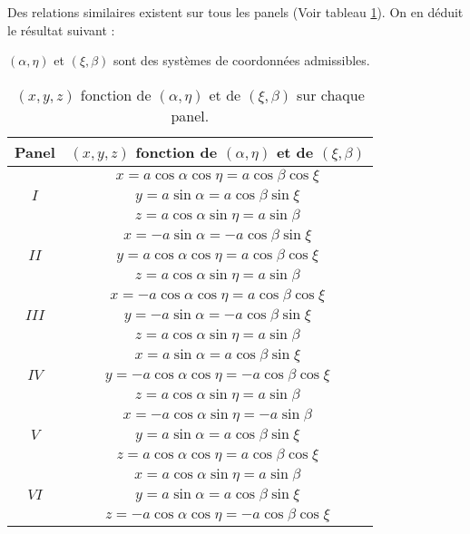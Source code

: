 Des relations similaires existent sur tous les panels (Voir tableau \ref{tab: x y z fct de xi eta alfa beta}). On en déduit le résultat suivant :

\begin{theoreme}
$(\alpha, \eta)$ et $(\xi, \beta)$ sont des systèmes de coordonnées admissibles.
\end{theoreme} 


\begin{table}[htbp]
\begin{center}
\begin{tabular}{|c|c|}
\hline
\textbf{Panel} & $(x,y,z)$ \textbf{fonction de} $(\alpha, \eta)$ \textbf{et de} $(\xi, \beta)$ \\

\hline
\hline
    & $x=a \cos \alpha \cos \eta  =  a \cos \beta \cos \xi$ \\ 
$I$ & $y=a \sin \alpha  =  a \cos \beta \sin \xi$ \\
    & $z=a \cos \alpha \sin \eta  =  a \sin \beta$ \\
\hline
      & $x=- a \sin \alpha  = - a \cos \beta \sin \xi$ \\ 
$II$  & $y=a \cos \alpha \cos \eta  =  a \cos \beta \cos \xi$ \\
      & $z=a \cos \alpha \sin \eta  =  a \sin \beta$ \\
\hline
      & $x=- a \cos \alpha \cos \eta = a \cos \beta \cos \xi$ \\ 
$III$ & $y=- a \sin \alpha = - a \cos \beta \sin \xi$ \\
      & $z=a \cos \alpha \sin \eta = a \sin \beta$ \\
\hline
      & $x=a \sin \alpha = a \cos \beta \sin \xi$ \\ 
$IV$  & $y=- a \cos \alpha \cos \eta = - a \cos \beta \cos \xi$ \\
      & $z=a \cos \alpha \sin \eta = a \sin \beta$ \\
\hline
    & $x=-a \cos \alpha \sin \eta = - a \sin \beta$ \\ 
$V$ & $y=a \sin \alpha = a \cos \beta \sin \xi$ \\
    & $z=a \cos \alpha \cos \eta = a \cos \beta \cos \xi$ \\
\hline
     & $x=a \cos \alpha \sin \eta = a \sin \beta$ \\ 
$VI$ & $y=a \sin \alpha = a \cos \beta \sin \xi$ \\
     & $z=- a \cos \alpha \cos \eta = - a \cos \beta \cos \xi$ \\
\hline
\end{tabular}
\end{center}
\caption{$(x,y,z)$ fonction de $(\alpha, \eta)$ et de $(\xi, \beta)$  sur chaque panel.}
\label{tab: x y z fct de xi eta alfa beta}
\end{table}














